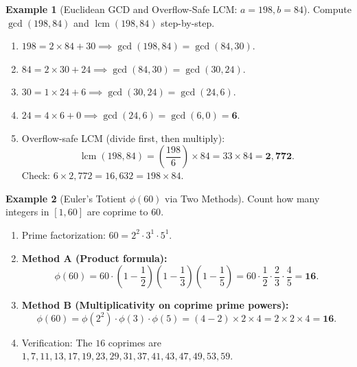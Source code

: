 \documentclass[11pt,a4paper]{article}
\theoremstyle{definition}
\newtheorem{example}{Example}[section]
\begin{document}
\begin{example}[Euclidean GCD and Overflow-Safe LCM: $a = 198, b = 84$]
Compute $\gcd(198, 84)$ and $\operatorname{lcm}(198, 84)$ step-by-step.
\begin{enumerate}
    \item $198 = 2 \times 84 + 30 \implies \gcd(198, 84) = \gcd(84, 30)$.
    \item $84 = 2 \times 30 + 24 \implies \gcd(84, 30) = \gcd(30, 24)$.
    \item $30 = 1 \times 24 + 6 \implies \gcd(30, 24) = \gcd(24, 6)$.
    \item $24 = 4 \times 6 + 0 \implies \gcd(24, 6) = \gcd(6, 0) = \mathbf{6}$.
    \item Overflow-safe LCM (divide first, then multiply):
    \[
        \operatorname{lcm}(198, 84) = \left(\frac{198}{6}\right) \times 84 = 33 \times 84 = \mathbf{2{,}772}.
    \]
    Check: $6 \times 2{,}772 = 16{,}632 = 198 \times 84$.
\end{enumerate}
\end{example}

\begin{example}[Euler's Totient $\phi(60)$ via Two Methods]
Count how many integers in $[1, 60]$ are coprime to $60$.
\begin{enumerate}
    \item Prime factorization: $60 = 2^2 \cdot 3^1 \cdot 5^1$.
    \item \textbf{Method A (Product formula):}
    \[
        \phi(60) = 60 \cdot \left(1 - \frac{1}{2}\right)\left(1 - \frac{1}{3}\right)\left(1 - \frac{1}{5}\right)
        = 60 \cdot \frac{1}{2} \cdot \frac{2}{3} \cdot \frac{4}{5} = \mathbf{16}.
    \]
    \item \textbf{Method B (Multiplicativity on coprime prime powers):}
    \[
        \phi(60) = \phi(2^2) \cdot \phi(3) \cdot \phi(5) = (4 - 2) \times 2 \times 4 = 2 \times 2 \times 4 = \mathbf{16}.
    \]
    \item Verification: The $16$ coprimes are $1, 7, 11, 13, 17, 19, 23, 29, 31, 37, 41, 43, 47, 49, 53, 59$.
\end{enumerate}
\end{example}
\end{document}
